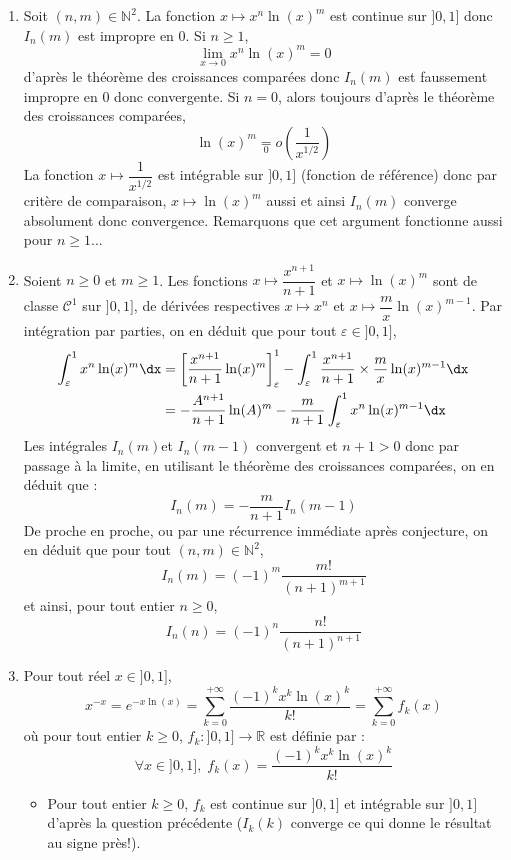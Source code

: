 \documentclass[a4paper,10pt]{report}
\begin{document}
\corr 

\begin{enumerate}
\item Soit $(n,m) \in \mathbb{N}^2$. La fonction $x \mapsto x^n \ln(x)^m$ est continue sur $]0,1]$ donc $I_n(m)$ est impropre en $0$. Si $n \geq 1$, 
$$ \lim_{x \rightarrow 0} x^n \ln(x)^m =0$$
d'après le théorème des croissances comparées donc $I_n(m)$ est faussement impropre en $0$ donc convergente. Si $n=0$, alors toujours d'après le théorème des croissances comparées,
$$ \ln(x)^m \underset{0}{=} o \left( \dfrac{1}{x^{1/2}} \right)$$
La fonction $x \mapsto \dfrac{1}{x^{1/2}}$ est intégrable sur $]0,1]$ (fonction de référence) donc par critère de comparaison, $x \mapsto \ln(x)^m$ aussi et ainsi $I_n(m)$ converge absolument donc convergence. Remarquons que cet argument fonctionne aussi pour $n \geq 1$...
\item Soient $n \geq 0$ et $m \geq 1$. Les fonctions $x \mapsto \dfrac{x^{n+1}}{n+1}$ et $x \mapsto \ln(x)^m$ sont de classe $\mathcal{C}^1$ sur $]0,1]$, de dérivées respectives $x \mapsto x^n$ et $x \mapsto \dfrac{m}{x} \ln(x)^{m-1}$. Par intégration par parties, on en déduit que pour tout $\varepsilon \in ]0,1]$,
\begin{align*}
\int_{\varepsilon}^1 x^n \ln(x)^m \dx & = \left[ \dfrac{x^{n+1}}{n+1} \ln(x)^m \right]_{\varepsilon}^1 - \int_{\varepsilon}^1 \dfrac{x^{n+1}}{n+1} \times \dfrac{m}{x} \ln(x)^{m-1} \dx \\
& = -\dfrac{A^{n+1}}{n+1} \ln(A)^m  -  \dfrac{m}{n+1} \int_{\varepsilon}^1 x^n \ln(x)^{m-1} \dx 
\end{align*}
Les intégrales $I_n(m)$et $I_n(m-1)$ convergent et $n+1>0$ donc par passage à la limite, en utilisant le théorème des croissances comparées, on en déduit que :
$$ I_n(m) = - \dfrac{m}{n+1} I_n(m-1)$$
De proche en proche, ou par une récurrence immédiate après conjecture, on en déduit que pour tout $(n,m) \in \mathbb{N}^2$,
$$ I_n(m) = (-1)^m \dfrac{m!}{(n+1)^{m+1}}$$
et ainsi, pour tout entier $n \geq 0$,
$$ I_n(n)= (-1)^n \dfrac{n!}{(n+1)^{n+1}}$$
\item Pour tout réel $x \in ]0,1]$,
$$ x^{-x} = e^{-x \ln(x)} = \sum_{k=0}^{+ \infty} \dfrac{(-1)^k x^k \ln(x)^k}{k!} = \sum_{k=0}^{+ \infty} f_k(x)$$
où pour tout entier $k \geq 0$, $f_k : ]0,1] \rightarrow \mathbb{R}$ est définie par :
$$ \forall x \in ]0,1], \; f_k(x) =  \dfrac{(-1)^k x^k \ln(x)^k}{k!}$$
\begin{itemize}
\item Pour tout entier $k \geq 0$, $f_k$ est continue sur $]0,1]$ et intégrable sur $]0,1]$ d'après la question précédente ($I_k(k)$ converge ce qui donne le résultat au signe près!).

\end{itemize}
\end{enumerate}
\end{document}
